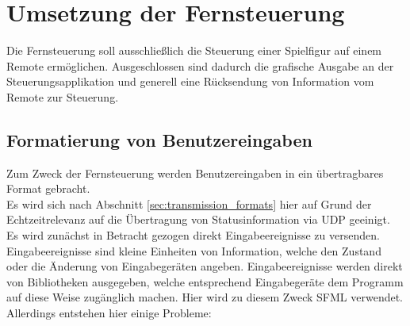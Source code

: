 \section{Umsetzung der Fernsteuerung}

Die Fernsteuerung soll ausschließlich die Steuerung einer Spielfigur auf einem Remote ermöglichen. Ausgeschlossen sind dadurch die grafische Ausgabe an der Steuerungsapplikation und generell eine Rücksendung von Information vom Remote zur Steuerung.\\

\subsection{Formatierung von Benutzereingaben}
Zum Zweck der Fernsteuerung werden Benutzereingaben in ein übertragbares Format gebracht.\\
Es wird sich nach Abschnitt \ref{sec:transmission_formats} hier auf Grund der Echtzeitrelevanz auf die Übertragung von Statusinformation via UDP geeinigt.\\
Es wird zunächst in Betracht gezogen direkt Eingabeereignisse zu versenden. Eingabeereignisse sind
kleine Einheiten von Information, welche den Zustand oder die Änderung von Eingabegeräten angeben. Eingabeereignisse werden direkt von Bibliotheken ausgegeben, welche entsprechend Eingabegeräte dem Programm auf diese Weise zugänglich machen. Hier wird zu diesem Zweck SFML\cite{sfml} verwendet.\\
Allerdings entstehen hier einige Probleme:
